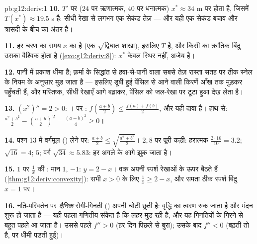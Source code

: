 \begin{solution}{pb:g12:deriv:1}
\textbf{10.} $T'$ पर  ($24$ पर ऋणात्मक, $40$ पर धनात्मक) $x^* \approx 34$ m
पर  होता है, जिसमें $T(x^*) \approx 19.5$ s है: सीधी रेखा से लगभग एक सेकंड तेज़ ---
और यही एक सेकंड बचाव और त्रासदी के बीच का अंतर है।

\textbf{11.} हर चरण का समय $x$ का   है (एक $\sqrt{\text{द्विघात}}$ शाखा), इसलिए $T$
 है, और किसी    का क्रांतिक बिंदु उसका वैश्विक 
होता है (\cref{exo:g12:deriv:8}): $x^*$ केवल स्थिर नहीं, अजेय है।

\textbf{12.} पानी में प्रकाश धीमा है; फ़र्मा के सिद्धांत से हवा-से-पानी वाला
सबसे तेज़ रास्ता सतह पर ठीक स्नेल के नियम के अनुसार मुड़ जाता है --- इसलिए
डूबी हुई पेंसिल से आने वाली किरणें आँख तक मुड़कर पहुँचती हैं, और मस्तिष्क,
सीधी रेखाएँ आगे बढ़ाकर, पेंसिल को जल-रेखा पर टूटा हुआ देख लेता है।

\textbf{13.} $(x^2)'' = 2 > 0$: ।  पर : $f\left(\frac{a+b}{2}\right) \leq
\frac{f(a) + f(b)}{2}$, और यही दावा है।
हाथ से: $\frac{a^2 + b^2}{2} - \left(\frac{a+b}{2}\right)^2 =
\frac{(a - b)^2}{4} \geq 0$।

\textbf{14.} प्रश्न 13 में वर्गमूल () लेने पर: $\frac{a + b}{2} \leq \sqrt{\frac{a^2 + b^2}{2}}$। $2, 8$ पर पूरी
कड़ी: हरात्मक $\frac{2 \cdot 16}{10} = 3.2$;  $\sqrt{16} = 4$;  $5$; वर्ग $\sqrt{34} \approx 5.83$: हर  अगले
के आगे झुक जाता है।

\textbf{15.} $1$ पर $\frac1x$ की : मान $1$,  $-1$: $y = 2 - x$।
 वक्र अपनी स्पर्श रेखाओं के ऊपर बैठते हैं (\cref{thm:g12:deriv:convexity}): सभी $x > 0$ के लिए
$\frac1x \geq 2 - x$, और समता ठीक स्पर्श बिंदु $x = 1$ पर।

\textbf{16.} नति-परिवर्तन पर \emph{दैनिक} रोगी-गिनती () अपनी चोटी छूती
है: वृद्धि का त्वरण रुक जाता है और मंदन शुरू हो जाता है --- यही पहला गणितीय
संकेत है कि लहर मुड़ रही है, और यह गिनतियों के गिरने से बहुत पहले आ जाता है।
उससे पहले $f'' > 0$ (हर दिन पिछले से बुरा); उसके बाद $f'' < 0$ (बढ़ती तो है, पर धीमी
पड़ती हुई)।


\end{solution}
